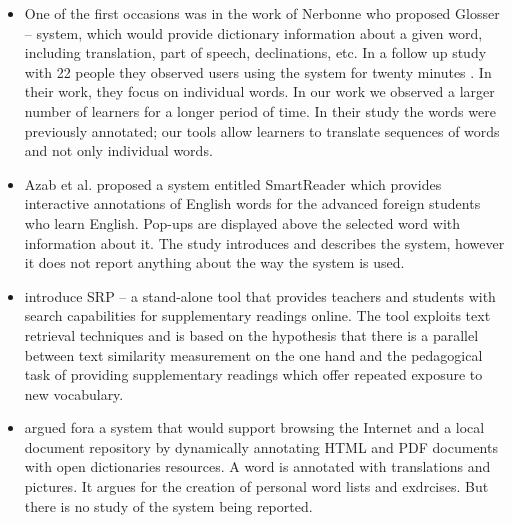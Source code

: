 \begin{itemize}

	\item One of the first occasions was in the work of Nerbonne \cite{Nerb99-Assistant} who proposed Glosser -- system, which would provide dictionary information about a given word, including translation, part of speech, declinations, etc. 
	In a follow up study with 22 people they observed users using the system for twenty minutes \cite{Dokter98-UserStudy}. 
	In their work, they focus on individual words. 
	In our work we observed a larger number of learners for a longer period of time.
	In their study the words were previously annotated; our tools allow learners to translate sequences of words and not only individual words. 

	\item Azab et al. \cite{Azab13-nlp} proposed a system entitled SmartReader which provides interactive annotations of English words for the advanced foreign students who learn English. 
	Pop-ups are displayed above the selected word with information about it. 
	The study introduces and describes the system, however it does not report anything about the way the system is used.

	\item \cite{Wible01-Exposure} introduce SRP -- a stand-alone tool that provides teachers and students with search capabilities for supplementary readings online.
	The tool exploits text retrieval techniques and is based on the hypothesis that there is a parallel between text similarity measurement on the one hand and the pedagogical task of providing supplementary readings which offer repeated exposure to new vocabulary.

	\item \cite{Streit05-Browsers} argued fora a system that would support browsing the Internet and a local document repository by dynamically annotating HTML and PDF documents with open dictionaries resources. A word is annotated with translations and pictures. It argues for the creation of personal word lists and exdrcises. But there is no study of the system being reported. 

\end{itemize}


